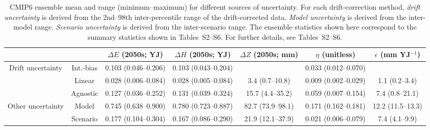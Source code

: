 \begin{table*}[t]
\centering
\caption{CMIP6 ensemble mean and range (minimum–maximum) for different sources of uncertainty. For each drift-correction method, \emph{drift uncertainty} is derived from the 2nd--98th inter-percentile range of the drift-corrected data. \emph{Model uncertainty} is derived from the inter-model range. \emph{Scenario uncertainty} is derived from the inter-scenario range. The ensemble statistics shown here correspond to the summary statistics shown in Tables~S2--S6. For further details, see Tables~S2--S6.}
\begin{tabular}{cc|c|c|c|c|c}
\toprule
 &  & $\Delta E$ (2050s; YJ) & $\Delta H$ (2050s; YJ) & $\Delta Z$ (2050s; mm) & $\eta$ (unitless) & $\epsilon$ (mm YJ$^{-1}$) \\
\midrule
\multirow[c]{3}{*}{Drift uncertainty} & Int.-bias & 0.103 (0.046–0.206) & 0.103 (0.043–0.204) &  & 0.033 (0.012–0.070) &  \\
 & Linear & 0.028 (0.006–0.084) & 0.028 (0.005–0.084) & 3.4 (0.7–10.8) & 0.009 (0.002–0.029) & 1.1 (0.2–3.4) \\
 & Agnostic & 0.127 (0.036–0.252) & 0.131 (0.039–0.324) & 15.7 (4.4–35.2) & 0.059 (0.007–0.154) & 7.4 (0.8–21.1) \\
\midrule
\multirow[c]{2}{*}{Other uncertainty} & Model & 0.745 (0.638–0.900) & 0.780 (0.723–0.887) & 82.7 (73.9–98.1) & 0.171 (0.162–0.181) & 12.2 (11.5–13.3) \\
 & Scenario & 0.177 (0.104–0.304) & 0.167 (0.086–0.290) & 21.9 (12.1–37.9) & 0.021 (0.006–0.079) & 7.4 (4.1–9.9) \\
\bottomrule
\end{tabular}
\end{table*}
